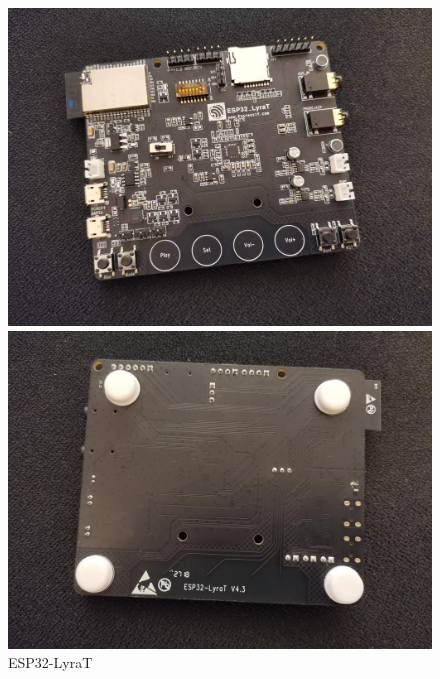 \documentclass[thesis=M,english]{FITthesis}[2019/12/23]
\begin{document}
\iftrue
\begin{figure}[H]
\centering
\begin{minipage}{.5\textwidth}
\centering
\includegraphics[width=1\linewidth]{images/ESP32-LyraT-1.jpg}
\end{minipage}%
\begin{minipage}{.5\textwidth}
\centering
\includegraphics[width=1\linewidth]{images/ESP32-LyraT-2.jpg}
\end{minipage}
\caption{ESP32-LyraT}
\label{esp32-lyrat}
\end{figure}
\fi
\end{document}
